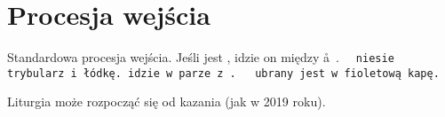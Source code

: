 \section{Procesja wejścia}

\begin{itemize*}
	\item Standardowa procesja wejścia. Jeśli jest , idzie on między
	      \aa~. \tt~ niesie trybularz i łódkę.  idzie w parze z \tt. \ii~ ubrany
	      jest w fioletową kapę.
	\item Liturgia może rozpocząć się od kazania (jak w 2019 roku).
\end{itemize*}